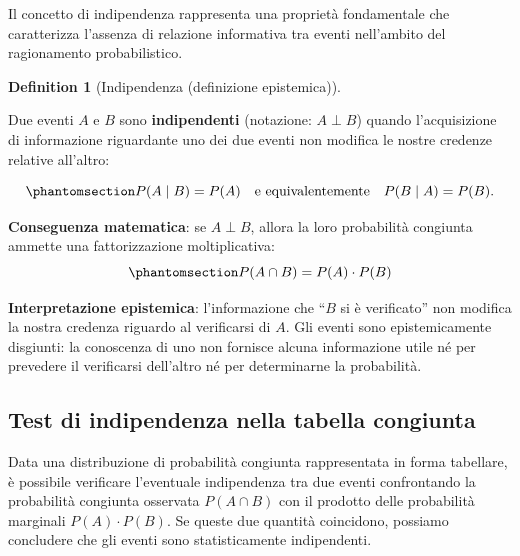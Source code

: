 \documentclass[
  letterpaper,
  DIV=11,
  numbers=noendperiod,
  oneside]{scrreprt}
\theoremstyle{definition}
\theoremstyle{plain}
\theoremstyle{definition}
\newtheorem{definition}{Definition}[chapter]
\theoremstyle{remark}
\begin{document}
Il concetto di indipendenza rappresenta una proprietà fondamentale che
caratterizza l'assenza di relazione informativa tra eventi nell'ambito
del ragionamento probabilistico.

\begin{definition}[Indipendenza (definizione
epistemica)]\protect\hypertarget{def-independence}{}\label{def-independence}

Due eventi \(A\) e \(B\) sono \textbf{indipendenti} (notazione:
\(A \perp B\)) quando l'acquisizione di informazione riguardante uno dei
due eventi non modifica le nostre credenze relative all'altro:

\begin{equation}\phantomsection\label{eq-independence-def}{
P(A \mid B) = P(A) \quad \text{e equivalentemente} \quad P(B \mid A) = P(B).
}\end{equation}

\textbf{Conseguenza matematica}: se \(A \perp B\), allora la loro
probabilità congiunta ammette una fattorizzazione moltiplicativa:
\begin{equation}\phantomsection\label{eq-independence-prod}{
P(A \cap B) = P(A) \cdot P(B)
}\end{equation}

\textbf{Interpretazione epistemica}: l'informazione che ``\(B\) si è
verificato'' non modifica la nostra credenza riguardo al verificarsi di
\(A\). Gli eventi sono epistemicamente disgiunti: la conoscenza di uno
non fornisce alcuna informazione utile né per prevedere il verificarsi
dell'altro né per determinarne la probabilità.

\end{definition}

\subsection{Test di indipendenza nella tabella
congiunta}\label{test-di-indipendenza-nella-tabella-congiunta}

Data una distribuzione di probabilità congiunta rappresentata in forma
tabellare, è possibile verificare l'eventuale indipendenza tra due
eventi confrontando la probabilità congiunta osservata \(P(A \cap B)\)
con il prodotto delle probabilità marginali \(P(A) \cdot P(B)\). Se
queste due quantità coincidono, possiamo concludere che gli eventi sono
statisticamente indipendenti.
\end{document}
